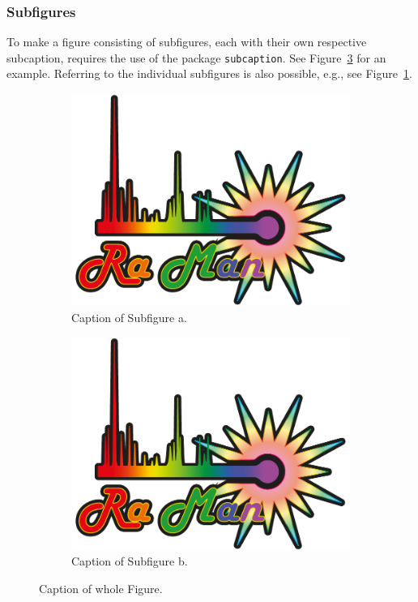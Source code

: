 \documentclass[main_brownies.tex]{subfiles}
\begin{document}
\subsubsection{Subfigures}
To make a figure consisting of subfigures, each with their own respective subcaption, requires the use of the package \verb*|subcaption|. See Figure~\ref{fig:subfigures} for an example. Referring to the individual subfigures is also possible, e.g., see Figure~\ref{fig:subfig_a}.

\begin{figure}[htb]
	\centering
	\begin{subfigure}[b][][c]{0.45\textwidth}
		\centering
		\includegraphics[width=\textwidth]{Subfigures/Subfigure_a}
		\caption{Caption of Subfigure a.}
		\label{fig:subfig_a}
	\end{subfigure}
	\hfill
	\begin{subfigure}[b][][c]{0.45\textwidth}
		\centering
		\includegraphics[width=\textwidth]{Subfigures/Subfigure_b}
		\caption{Caption of Subfigure b.}
		\label{fig:subfig_b}
	\end{subfigure}
	\caption{Caption of whole Figure.}
	\label{fig:subfigures}
\end{figure}
\end{document}
